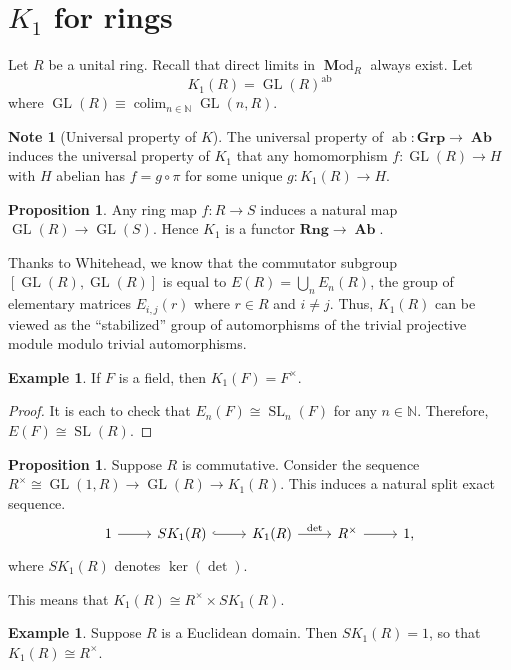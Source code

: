 \documentclass[10pt,letterpaper,cm]{nupset}
\theoremstyle{definition}
\newtheorem{exmp}[definition]{Example}
\newtheorem{note}[definition]{Note}
\theoremstyle{theorem}
\newtheorem{prop}[definition]{Proposition}
\theoremstyle{remark}
\newcommand{\N}{\mathbb N}
\newcommand{\1}{\mathbf{1}}
\newcommand{\0}{\vec 0}
\DeclareMathOperator*{\GL}{GL}
\DeclareMathOperator*{\SL}{SL}
\DeclareMathOperator{\ab}{ab}
\DeclareMathOperator{\colim}{colim}
\DeclareMathOperator{\Ab}{\mathbf{Ab}}
\DeclareMathOperator{\Mod}{\mathbf Mod}
\begin{document}
\section{$K_1$ for rings}


Let $R$ be a unital ring. Recall that direct limits in $\Mod_R$ always exist. Let $$K_1(R) = \GL(R)^{\ab}$$ where $\GL(R) \equiv\colim_{n \in \N} \GL(n, R)$.

\begin{note}[Universal property of $K$]
The universal property of $\ab: \mathbf{Grp} \to \Ab$ induces the universal property of $K_1$ that any homomorphism $f: \GL(R) \to H$ with $H$ abelian has $f = g \circ \pi$ for some unique $g: K_1(R) \to H$.
\end{note}

\begin{prop}
Any ring map $f: R \to S$ induces a natural map $\GL(R) \to \GL(S)$. Hence $K_1$ is a functor $\mathbf{Rng} \to \Ab$.
\end{prop}


Thanks to Whitehead, we know that the commutator subgroup $\left[\GL(R), \GL(R)\right]$ is equal to $E(R) = \bigcup_n E_n(R)$, the group of elementary matrices $E_{i, j}(r)$ where $r \in R$ and $i\ne j$. Thus, $K_1(R)$ can be viewed as the ``stabilized'' group of automorphisms of the trivial projective module modulo trivial automorphisms.


\begin{exmp}
If $F$ is a field, then $K_1(F) = F^{\times}$.
\end{exmp}
\begin{proof}
It is each to check that $E_n(F) \cong \SL_n(F)$ for any $n\in \N$. Therefore, $E(F) \cong \SL(R)$.
\end{proof}

\begin{prop}
Suppose $R$ is commutative. Consider the sequence $R^{\times} \cong \GL(1, R) \to \GL(R) \to K_1(R)$. This induces a natural split exact sequence.
\[
\begin{tikzcd}
1 \arrow[r] & SK_1(R) \arrow[r, hook] & K_1(R) \arrow[r, "\det"] & R^{\times} \arrow[r] & 1,
\end{tikzcd}
\]
where $SK_1(R)$ denotes $\ker(\det)$.
\end{prop}

This means that $K_1(R) \cong R^{\times} \times SK_1(R)$.

\begin{exmp}
Suppose $R$ is a Euclidean domain. Then $SK_1(R) =1$, so that $K_1(R) \cong R^{\times}$.
\end{exmp}
\end{document}
